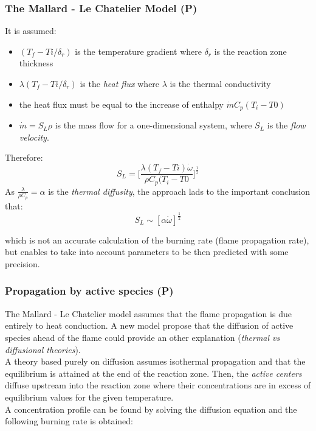 \documentclass[12pt]{article}
\begin{document}
\subsubsection{The Mallard - Le Chatelier Model (P)}

It is assumed:
\begin{itemize}
    \item $(T_{f}-T{i}/\delta_{r})$ is the temperature gradient where $\delta_{r}$ is the reaction zone thickness
    \item $\lambda(T_{f}-T{i}/\delta_{r})$ is the \textit{heat flux} where $\lambda$ is the thermal conductivity
    \item the heat flux must be equal to the increase of enthalpy $\dot{m}C_{p}(T_{i}-T{0})$
    \item $\dot{m}=S_{L}\rho$ is the mass flow for a one-dimensional system, where \textbf{$S_{L}$} is the \textit{flow velocity}.
\end{itemize}
Therefore:
\begin{equation}
    S_{L} = \bigg[\frac{\lambda(T_{f}-T{i})\dot{\omega}}{\rho C_{p}(T_{i}-T{0}}\bigg]^{\frac{1}{2}}
\end{equation}
As $\frac{\lambda}{\rho C_{p}} = \alpha$ is the \textit{thermal diffusity}, the approach lads to the important conclusion that:
\begin{equation}
    S_{L}\sim[\alpha \dot{\omega}]^{\frac{1}{2}}
\end{equation}

which is not an accurate calculation of the burning rate (flame propagation rate), but enables to take into account parameters to be then predicted with some precision.

\subsubsection{Propagation by active species (P)}

The Mallard - Le Chatelier model assumes that the flame propagation is due entirely to heat conduction. A new model propose that the diffusion of active species ahead of the flame could provide an other explanation (\textit{thermal vs diffusional theories}).\\
A theory based purely on diffusion assumes isothermal propagation and that the equilibrium is attained at the end of the reaction zone. Then, the \textit{active centers} diffuse upstream into the reaction zone where their concentrations are in excess of equilibrium values for the given temperature.\\
A concentration profile can be found by solving the diffusion equation and the following burning rate is obtained:
\end{document}

